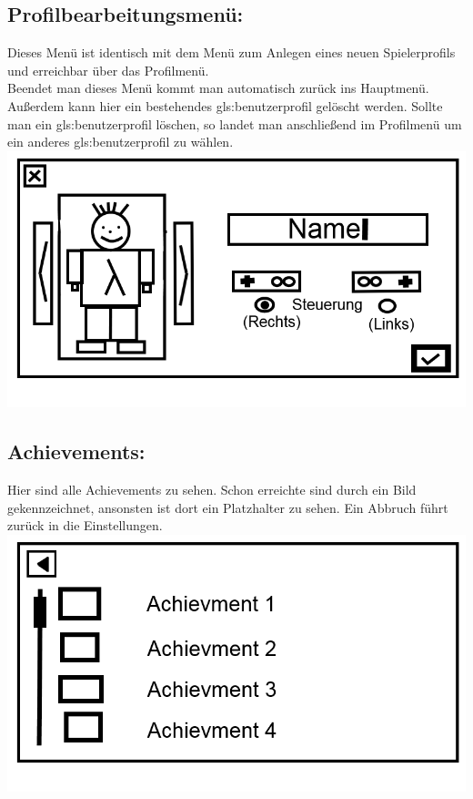 \documentclass{scrartcl}
\begin{document}
\begin{enumerate}
	\begin{minipage}{1\textwidth}
		\item \subsection*{Profilbearbeitungsmenü:}
		Dieses Menü ist identisch mit dem Menü zum Anlegen eines neuen Spielerprofils und erreichbar über das Profilmenü.\\
		Beendet man dieses Menü kommt man automatisch zurück ins Hauptmenü.\\
		Außerdem kann hier ein bestehendes \gls{gls:benutzerprofil} gelöscht werden. Sollte man ein \gls{gls:benutzerprofil} löschen, so landet man anschließend im Profilmenü um ein anderes \gls{gls:benutzerprofil} zu wählen.
		\includegraphics[scale=0.5]{assets/CreateProfile2}
	\end{minipage}

	\begin{minipage}{1\textwidth}
		\item \subsection*{Achievements:}
		Hier sind alle Achievements zu sehen. Schon erreichte sind durch ein Bild gekennzeichnet, ansonsten ist dort ein Platzhalter zu sehen. Ein Abbruch führt zurück in die Einstellungen.\\
		\includegraphics[scale=0.5]{assets/Achievments}
		

\end{minipage}
\end{enumerate}
\end{document}

